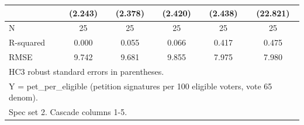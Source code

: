 \begin{table}[htbp]
\begin{tabular}{l*{5}{c}}
            &     (2.243)   &     (2.378)   &     (2.420)   &     (2.438)   &    (22.821)   \\
\midrule
N           &          25   &          25   &          25   &          25   &          25   \\
R-squared   &       0.000   &       0.055   &       0.066   &       0.417   &       0.475   \\
RMSE        &       9.742   &       9.681   &       9.855   &       7.975   &       7.980   \\
\bottomrule
\multicolumn{6}{l}{\footnotesize HC3 robust standard errors in parentheses.}\\
\multicolumn{6}{l}{\footnotesize Y = pet\_per\_eligible (petition signatures per 100 eligible voters, vote 65 denom).}\\
\multicolumn{6}{l}{\footnotesize Spec set 2. Cascade columns 1-5.}\\
\end{tabular}
\end{table}

